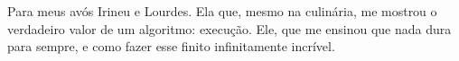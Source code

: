 Para meus avós Irineu e Lourdes.
\newline
\newline
Ela que, mesmo na culinária, me mostrou o verdadeiro valor de um algoritmo: execução. Ele, que me ensinou que nada dura para sempre, e como fazer esse finito infinitamente incrível.
